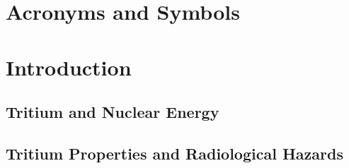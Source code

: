 \documentclass[12pt,a4paper]{book}
\begin{document}
\newpage

\chapter*{Acronyms and Symbols} \label{chap:NomenclatureAcronyms}  %
{} %




\tableofcontents

\listoffigures

{} %

\listoftables

{} %




\chapter{Introduction}  \label{chap:GeneralIntroduction}  %
	\section{Tritium and Nuclear Energy}\label{sec:Introduction}
	 
	
	\section{Tritium Properties and Radiological Hazards}\label{sec:TritiumProperties}
	
	
\end{document}
